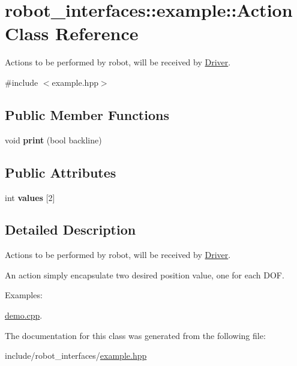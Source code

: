 \hypertarget{classrobot__interfaces_1_1example_1_1Action}{}\section{robot\+\_\+interfaces\+:\+:example\+:\+:Action Class Reference}
\label{classrobot__interfaces_1_1example_1_1Action}


Actions to be performed by robot, will be received by \hyperlink{classrobot__interfaces_1_1example_1_1Driver}{Driver}.  




{\ttfamily \#include $<$example.\+hpp$>$}

\subsection*{Public Member Functions}
\begin{DoxyCompactItemize}
\item 
\mbox{\label{classrobot__interfaces_1_1example_1_1Action_aafdd1a4294fb59562470365069998489}} 
void {\bfseries print} (bool backline)
\end{DoxyCompactItemize}
\subsection*{Public Attributes}
\begin{DoxyCompactItemize}
\item 
\mbox{\label{classrobot__interfaces_1_1example_1_1Action_ae257ddae63338cf7bcc63d199a130098}} 
int {\bfseries values} \mbox{[}2\mbox{]}
\end{DoxyCompactItemize}


\subsection{Detailed Description}
Actions to be performed by robot, will be received by \hyperlink{classrobot__interfaces_1_1example_1_1Driver}{Driver}. 

An action simply encapsulate two desired position value, one for each D\+OF. \begin{Desc}
\item[Examples\+: ]\par
\hyperlink{demo_8cpp-example}{demo.\+cpp}.\end{Desc}


The documentation for this class was generated from the following file\+:\begin{DoxyCompactItemize}
\item 
include/robot\+\_\+interfaces/\hyperlink{example_8hpp}{example.\+hpp}\end{DoxyCompactItemize}
